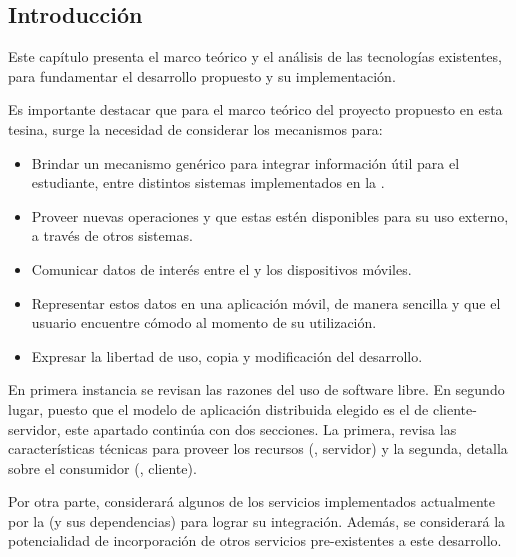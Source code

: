 \subsection{Introducción}
\label{analisis_servicios_introduccion}

Este capítulo presenta el marco teórico y el análisis de las tecnologías existentes, para fundamentar el desarrollo propuesto y su implementación.

Es importante destacar que para el marco teórico del proyecto propuesto en esta tesina, surge la necesidad de considerar los mecanismos para:
\begin{itemize}
\item Brindar un mecanismo genérico para integrar información útil para el estudiante, entre distintos sistemas implementados en la \unlp{}.
\item Proveer nuevas operaciones y que estas estén disponibles para su uso externo, a través de otros sistemas.
\item Comunicar datos de interés entre el  y los dispositivos móviles.
\item Representar estos datos en una aplicación móvil, de manera sencilla y que el usuario encuentre cómodo al momento de su utilización.
\item Expresar la libertad de uso, copia y modificación del desarrollo.
\end{itemize}

En primera instancia se revisan las razones del uso de software libre.
En segundo lugar, puesto que el modelo de aplicación distribuida elegido es el de cliente-servidor, este apartado continúa con dos secciones. La primera, revisa las características técnicas para proveer los recursos (, servidor) y la segunda, detalla sobre el consumidor (, cliente).

Por otra parte, considerará algunos de los servicios implementados actualmente por la \unlp{} (y sus dependencias) para lograr su integración. Además, se considerará la potencialidad de incorporación de otros servicios pre-existentes a este desarrollo.



